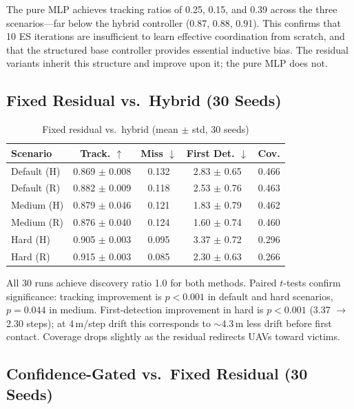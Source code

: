 \documentclass[conference]{IEEEtran}
\begin{document}
The pure MLP achieves tracking ratios of 0.25, 0.15, and 0.39 across the three
scenarios---far below the hybrid controller (0.87, 0.88, 0.91). This confirms that
10 ES iterations are insufficient to learn effective coordination from scratch, and
that the structured base controller provides essential inductive bias. The residual
variants inherit this structure and improve upon it; the pure MLP does not.

\subsection{Fixed Residual vs.\ Hybrid (30 Seeds)}

\begin{table}[t]
\centering
\caption{Fixed residual vs.\ hybrid (mean $\pm$ std, 30 seeds)}
\small
\begin{tabular}{@{}lcccc@{}}
\toprule
Scenario & Track. $\uparrow$ & Miss $\downarrow$ & First Det. $\downarrow$ & Cov. \\
\midrule
Default (H) & 0.869 $\pm$ 0.008 & 0.132 & 2.83 $\pm$ 0.65 & 0.466 \\
Default (R) & 0.882 $\pm$ 0.009 & 0.118 & 2.53 $\pm$ 0.76 & 0.463 \\
\midrule
Medium (H)  & 0.879 $\pm$ 0.046 & 0.121 & 1.83 $\pm$ 0.79 & 0.462 \\
Medium (R)  & 0.876 $\pm$ 0.040 & 0.124 & 1.60 $\pm$ 0.74 & 0.460 \\
\midrule
Hard (H)    & 0.905 $\pm$ 0.003 & 0.095 & 3.37 $\pm$ 0.72 & 0.296 \\
Hard (R)    & 0.915 $\pm$ 0.003 & 0.085 & 2.30 $\pm$ 0.63 & 0.266 \\
\bottomrule
\end{tabular}
\end{table}

All 30 runs achieve discovery ratio 1.0 for both methods. Paired $t$-tests confirm
significance: tracking improvement is $p < 0.001$ in default and hard scenarios,
$p = 0.044$ in medium. First-detection improvement in hard is $p < 0.001$ (3.37 $\to$
2.30 steps); at 4\,m/step drift this corresponds to $\sim$4.3\,m less drift before
first contact. Coverage drops slightly as the residual redirects UAVs toward victims.

\subsection{Confidence-Gated vs.\ Fixed Residual (30 Seeds)}
\end{document}
